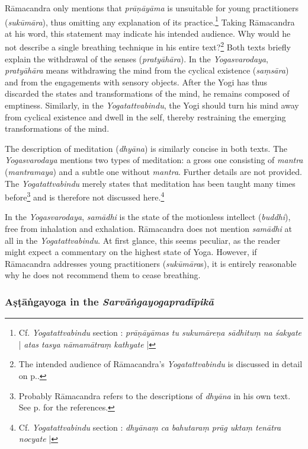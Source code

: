 Rāmacandra only mentions that \textit{prāṇāyāma} is unsuitable for young practitioners (\textit{sukūmāra}), thus omitting any explanation of its practice.\footnote{Cf. \textit{Yogatattvabindu} section : \textit{prāṇāyāmas tu sukumāreṇa sādhituṃ na śakyate} | \textit{atas tasya nāmamātraṃ kathyate} |} Taking Rāmacandra at his word, this statement may indicate his intended audience. Why would he not describe a single breathing technique in his entire text?\footnote{The intended audience of Rāmacandra's \textit{Yogatattvabindu} is discussed in detail on p.\pageref{ytbaudience}.}
Both texts briefly explain the withdrawal of the senses (\textit{pratyāhāra}). In the \textit{Yogasvarodaya}, \textit{pratyāhāra} means withdrawing the mind from the cyclical existence (\textit{saṃsāra}) and from the engagements with sensory objects. After the Yogi has thus discarded the states and transformations of the mind, he remains composed of emptiness. Similarly, in the \textit{Yogatattvabindu}, the Yogi should turn his mind away from cyclical existence and dwell in the self, thereby restraining the emerging transformations of the mind.

The description of meditation (\textit{dhyāna}) is similarly concise in both texts. The \textit{Yogasvarodaya} mentions two types of meditation: a gross one consisting of \textit{mantra} (\textit{mantramaya}) and a subtle one without \textit{mantra}. Further details are not provided. The \textit{Yogatattvabindu} merely states that meditation has been taught many times before\footnote{Probably Rāmacandra refers to the descriptions of \emph{dhyāna} in his own text. See p. \pageref{ramacandradhyana} for the references.} and is therefore not discussed here.\footnote{Cf. \textit{Yogatattvabindu} section : \textit{dhyānaṃ ca bahutaraṃ prāg uktaṃ tenātra nocyate} |}

In the \textit{Yogasvarodaya}, \textit{samādhi} is the state of the motionless intellect (\textit{buddhi}), free from inhalation and exhalation. Rāmacandra does not mention \textit{samādhi} at all in the \textit{Yogatattvabindu}. At first glance, this seems peculiar, as the reader might expect a commentary on the highest state of Yoga. However, if Rāmacandra addresses young practitioners (\textit{sukūmāra}s), it is entirely reasonable why he does not recommend them to cease breathing.

\subsubsection{Aṣṭāṅgayoga in the \textit{Sarvāṅgayogapradīpikā}}

